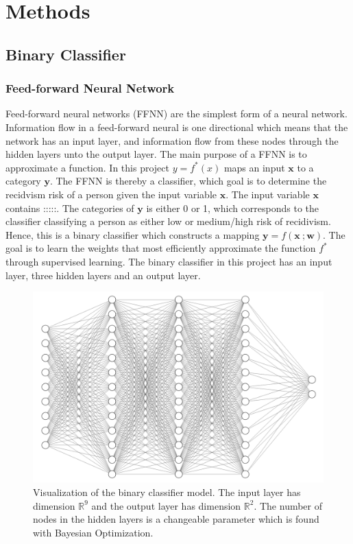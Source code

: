 \documentclass[11pt, fleqn, titlepage]{article}
\begin{document}
	
	\section{Methods}
	 
	\subsection{Binary Classifier}\label{Feed-forward neural}
	\subsubsection{Feed-forward Neural Network}
	Feed-forward neural networks (FFNN) are the simplest form of a neural network. Information flow in a feed-forward neural is one directional which means that the network has an input layer, and information flow from these nodes through the hidden layers unto the output layer. The main purpose of a FFNN is to approximate a function. In this project $ y = f^*(x) $ maps an input $ \mathbf x $ to a category $ \mathbf y $. The FFNN is thereby a classifier, which goal is to determine the recidvism risk of a person given the input variable $ \mathbf x $. The input variable $ \mathbf x $ contains :::::. The categories of $ \mathbf y $ is either 0 or 1, which corresponds to the classifier classifying a person as either low or medium/high risk of recidivism. Hence, this is a binary classifier which constructs a mapping $ \mathbf y = f(\mathbf x \ ; \mathbf w) $. The goal is to learn the weights that most efficiently approximate the function $ f^* $ through supervised learning. The binary classifier in this project has an input layer, three hidden layers and an output layer. 
	
	\begin{figure}[H]
		\centering
		\includegraphics[width=0.5\linewidth]{imgs/ffnn}
		\caption{Visualization of the binary classifier model. The input layer has dimension $ \mathbb R ^9$ and the output layer has dimension $ \mathbb R^2 $. The number of nodes in the hidden layers is a changeable parameter which is found with Bayesian Optimization. }
		\label{fig:ffnn}
	\end{figure}
	
\end{document}
